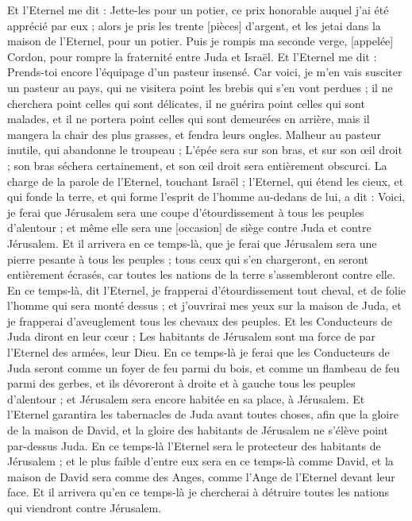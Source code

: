 \begin{multicols}{2}
Et l'Eternel me dit : Jette-les pour un potier, ce prix honorable auquel j'ai été apprécié par eux ; alors je pris les trente [pièces] d'argent, et les jetai dans la maison de l'Eternel, pour un potier.
Puis je rompis ma seconde verge, [appelée] Cordon, pour rompre la fraternité entre Juda et Israël.
Et l'Eternel me dit : Prends-toi encore l'équipage d'un pasteur insensé.
Car voici, je m'en vais susciter un pasteur au pays, qui ne visitera point les brebis qui s'en vont perdues ; il ne cherchera point celles qui sont délicates, il ne guérira point celles qui sont malades, et il ne portera point celles qui sont demeurées en arrière, mais il mangera la chair des plus grasses, et fendra leurs ongles.
Malheur au pasteur inutile, qui abandonne le troupeau ; L'épée sera sur son bras, et sur son œil droit ; son bras séchera certainement, et son œil droit sera entièrement obscurci.
\VerseOne{}La charge de la parole de l'Eternel, touchant Israël ; l'Eternel, qui étend les cieux, et qui fonde la terre, et qui forme l'esprit de l'homme au-dedans de lui, a dit :
Voici, je ferai que Jérusalem sera une coupe d'étourdissement à tous les peuples d'alentour ; et même elle sera une [occasion] de siège contre Juda et contre Jérusalem.
Et il arrivera en ce temps-là, que je ferai que Jérusalem sera une pierre pesante à tous les peuples ; tous ceux qui s'en chargeront, en seront entièrement écrasés, car toutes les nations de la terre s'assembleront contre elle.
En ce temps-là, dit l'Eternel, je frapperai d'étourdissement tout cheval, et de folie l'homme qui sera monté dessus ; et j'ouvrirai mes yeux sur la maison de Juda, et je frapperai d'aveuglement tous les chevaux des peuples.
Et les Conducteurs de Juda diront en leur cœur ; Les habitants de Jérusalem sont ma force de par l'Eternel des armées, leur Dieu.
En ce temps-là je ferai que les Conducteurs de Juda seront comme un foyer de feu parmi du bois, et comme un flambeau de feu parmi des gerbes, et ils dévoreront à droite et à gauche tous les peuples d'alentour ; et Jérusalem sera encore habitée en sa place, à Jérusalem.
Et l'Eternel garantira les tabernacles de Juda avant toutes choses, afin que la gloire de la maison de David, et la gloire des habitants de Jérusalem ne s'élève point par-dessus Juda.
En ce temps-là l'Eternel sera le protecteur des habitants de Jérusalem ; et le plus faible d'entre eux sera en ce temps-là comme David, et la maison de David sera comme des Anges, comme l'Ange de l'Eternel devant leur face.
Et il arrivera qu'en ce temps-là je chercherai à détruire toutes les nations qui viendront contre Jérusalem.

\end{multicols}
